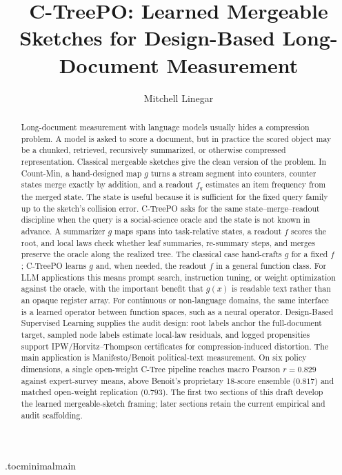 \documentclass[11pt]{article}
\title{C-TreePO: Learned Mergeable Sketches for Design-Based Long-Document Measurement}
\author{Mitchell Linegar}
\date{}
\begin{document}
\maketitle

\begin{abstract}
Long-document measurement with language models usually hides a compression
problem. A model is asked to score a document, but in practice the scored
object may be a chunked, retrieved, recursively summarized, or otherwise
compressed representation. Classical mergeable sketches give the clean
version of the problem. In Count-Min, a hand-designed map $g$ turns a stream
segment into counters, counter states merge exactly by addition, and a readout
$f_q$ estimates an item frequency from the merged state. The state is useful
because it is sufficient for the fixed query family up to the sketch's
collision error. C-TreePO asks for the same state--merge--readout discipline
when the query is a social-science oracle and the state is not known in
advance. A summarizer $g$ maps spans into task-relative states, a readout $f$
scores the root, and local laws check whether leaf summaries, re-summary
steps, and merges preserve the oracle along the realized tree. The classical
case hand-crafts $g$ for a fixed $f$; C-TreePO learns $g$ and, when needed,
the readout $f$ in a general function class. For LLM applications this means
prompt search, instruction tuning, or weight optimization against the oracle,
with the important benefit that $g(x)$ is readable text rather than an opaque
register array. For continuous or non-language domains, the same interface is
a learned operator between function spaces, such as a neural operator.
Design-Based Supervised Learning supplies the audit design: root labels anchor
the full-document target, sampled node labels estimate local-law residuals,
and logged propensities support IPW/Horvitz--Thompson certificates for
compression-induced distortion. The main application is Manifesto/Benoit
political-text measurement. On six policy dimensions, a single open-weight
C-Tree pipeline reaches macro Pearson $r=0.829$ against expert-survey means,
above Benoit's proprietary 18-score ensemble ($0.817$) and matched open-weight
replication ($0.793$). The first two sections of this draft develop the
learned mergeable-sketch framing; later sections retain the current empirical
and audit scaffolding.
\end{abstract}

\tableofcontents
\clearpage

\etocdepthtag.toc{minimalmain}


\end{document}
